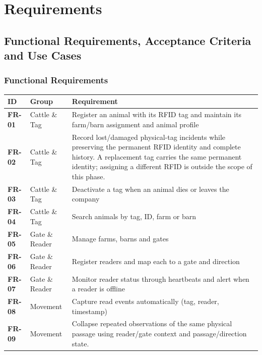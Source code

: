 \section{Requirements}\label{sec:2}

\subsection{Functional Requirements, Acceptance Criteria and Use Cases}\label{sec:2.1}

\subsubsection{Functional Requirements}\label{sec:2.1.1}

{\small
\begin{longtable}[]{|>{\raggedright\arraybackslash}p{}|>{\raggedright\arraybackslash}p{}|>{\raggedright\arraybackslash}p{}|}
\hline
\textbf{ID} & \textbf{Group} & \textbf{Requirement} \\ \hline
\endhead
\textbf{FR-01} & Cattle \& Tag & Register an animal with its RFID tag
and maintain its farm/barn assignment and animal profile \\ \hline
\textbf{FR-02} & Cattle \& Tag & Record lost/damaged physical-tag
incidents while preserving the permanent RFID identity and complete
history. A replacement tag carries the same permanent identity;
assigning a different RFID is outside the scope of this phase. \\ \hline
\textbf{FR-03} & Cattle \& Tag & Deactivate a tag when an animal dies or
leaves the company \\ \hline
\textbf{FR-04} & Cattle \& Tag & Search animals by tag, ID, farm or
barn \\ \hline
\textbf{FR-05} & Gate \& Reader & Manage farms, barns and gates \\ \hline
\textbf{FR-06} & Gate \& Reader & Register readers and map each to a
gate and direction \\ \hline
\textbf{FR-07} & Gate \& Reader & Monitor reader status through
heartbeats and alert when a reader is offline \\ \hline
\textbf{FR-08} & Movement & Capture read events automatically (tag,
reader, timestamp) \\ \hline
\textbf{FR-09} & Movement & Collapse repeated observations of the same
physical passage using reader/gate context and passage/direction state.

\end{longtable}}
